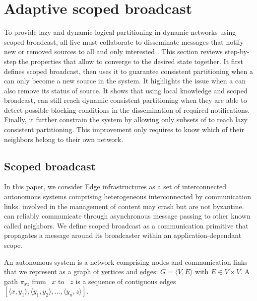 
\section{Adaptive scoped broadcast}
\label{sec:adaptive}

To provide lazy and dynamic logical partitioning in dynamic networks
using scoped broadcast, all live \processes must collaborate to
disseminate messages that notify new or removed sources to all and
only interested \processes. This section reviews step-by-step the
properties that allow \processes to converge to the desired state
together. It first defines scoped broadcast, then uses it to guarantee
consistent partitioning when a \process can only become a new source
in the system. It highlights the issue when a \process can also remove
its status of source. It shows that using local knowledge and scoped
broadcast, \processes can still reach dynamic consistent partitioning
when they are able to detect possible blocking conditions in the
dissemination of required notifications. Finally, it further constrain
the system by allowing only subsets of \processes to reach lazy
consistent partitioning. This improvement only requires \processes to
know which of their neighbors belong to their own network.

\subsection{Scoped broadcast}
\label{subsec:scoped}

In this paper, we consider Edge infrastructures as a set of
interconnected autonomous systems comprising heterogeneous \nodes
interconnected by communication links. \Processes involved in the
management of content may crash but are not byzantine.  \Processes can
reliably communicate through asynchronous message passing to other
known \processes called neighbors.  We define scoped broadcast as a
communication primitive that propagates a message around its
broadcaster within an application-dependant scope.

\begin{definition}
  An autonomous system is a network comprising nodes and communication
  links that we represent as a \underline{g}raph of
  \underline{v}ertices and \underline{e}dges:
  $G = \langle V, E \rangle$ with $E \in V \times V$. A
  \underline{p}ath $\pi_{xz}$ from \Process~$x$ to \Process~$z$ is a
  sequence of contiguous edges
  $[\langle x, y_1 \rangle, \langle y_1, y_2\rangle, \ldots, \langle
  y_n, z \rangle]$.
\end{definition}

